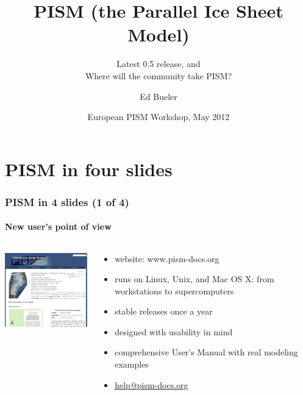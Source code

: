 \documentclass[hide notes,intlimits]{beamer}
\title[] %
{PISM (the Parallel Ice Sheet Model)}
\subtitle{Latest 0.5 release, and \\ Where will the community take PISM?}
\author[Bueler] %
{Ed Bueler}
\institute{
University of Alaska Fairbanks
}
\date{European PISM Workshop, May 2012}
\begin{document}
\AtBeginSection[]{}


{
} 

\begin{frame}
  \titlepage
\end{frame}

{
}

\section{PISM in four slides}

\begin{frame}
  \frametitle{PISM in 4 slides (1 of 4)}
  \framesubtitle{New user's point of view}
  \begin{columns}
    \begin{column}{50mm}
      \includegraphics[width=50mm]{pismdocs.png}
    \end{column}
    \begin{column}{70mm}
      \begin{itemize}
      \item website: \alert{www.pism-docs.org}
      \item runs on Linux, Unix, and Mac OS X: from
        workstations to supercomputers
      \item stable releases once a year
      \item designed with usability in mind
      \item comprehensive User's Manual with real modeling examples
      \item \url{help@pism-docs.org}
      \end{itemize}
    \end{column}
  \end{columns}
\end{frame}
\end{document}
